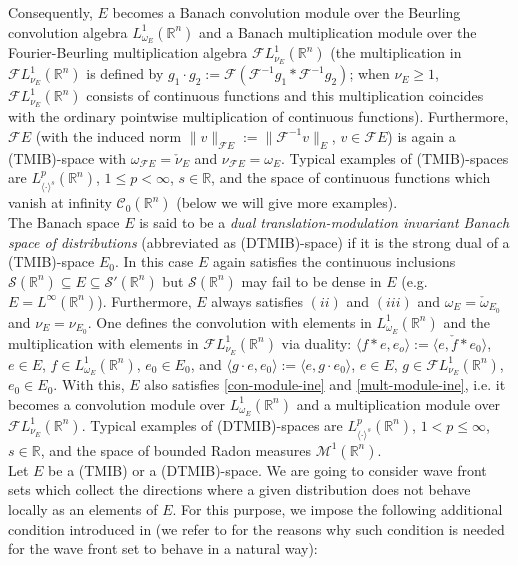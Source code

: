 \documentclass[12pt,reqno]{amsart}
\newcommand{\RR}{\mathbb R}
\newcommand{\SSS}{\mathcal S}
\theoremstyle{plain}
\theoremstyle{remark}
\theoremstyle{definition}
\numberwithin{equation}{section}
\begin{document}
Consequently, $E$ becomes a Banach convolution module over the Beurling convolution algebra $L^1_{\omega_E}(\RR^n)$ and a Banach multiplication module over the Fourier-Beurling multiplication algebra $\mathcal{F}L^1_{\nu_E}(\RR^n)$ (the multiplication in $\mathcal{F}L^1_{\nu_E}(\RR^n)$ is defined by $g_1\cdot g_2:=\mathcal{F}(\mathcal{F}^{-1}g_1*\mathcal{F}^{-1}g_2)$; when $\nu_E\geq 1$, $\mathcal{F}L^1_{\nu_E}(\RR^n)$ consists of continuous functions and this multiplication coincides with the ordinary pointwise multiplication of continuous functions). Furthermore, $\mathcal{F}E$ (with the induced norm $\|v\|_{\mathcal{F}E}:=\|\mathcal{F}^{-1}v\|_E$, $v\in\mathcal{F}E$) is again a (TMIB)-space with $\omega_{\mathcal{F}E}=\check{\nu}_E$ and $\nu_{\mathcal{F}E}=\omega_E$. Typical examples of (TMIB)-spaces are $L^p_{\langle\cdot\rangle^s}(\RR^n)$, $1\leq p<\infty$, $s\in\RR$, and the space of continuous functions which vanish at infinity $\mathcal{C}_0(\RR^n)$ (below we will give more examples).\\
\indent The Banach space $E$ is said to be a \textit{dual translation-modulation invariant Banach space of distributions} (abbreviated as (DTMIB)-space) if it is the strong dual of a (TMIB)-space $E_0$. In this case $E$ again satisfies the continuous inclusions $\SSS(\RR^n)\subseteq E\subseteq \SSS'(\RR^n)$ but $\SSS(\RR^n)$ may fail to be dense in $E$ (e.g. $E=L^{\infty}(\RR^n)$). Furthermore, $E$ always satisfies $(ii)$ and $(iii)$ and $\omega_E=\check{\omega}_{E_0}$ and $\nu_E=\nu_{E_0}$. One defines the convolution with elements in $L^1_{\omega_E}(\RR^n)$ and the multiplication with elements in $\mathcal{F}L^1_{\nu_E}(\RR^n)$ via duality: $\langle f*e,e_o\rangle:=\langle e,\check{f}*e_0\rangle$, $e\in E$, $f\in L^1_{\omega_E}(\RR^n)$, $e_0\in E_0$, and $\langle g\cdot e,e_0\rangle:=\langle e,g\cdot e_0\rangle$, $e\in E$, $g\in \mathcal{F}L^1_{\nu_E}(\RR^n)$, $e_0\in E_0$. With this, $E$ also satisfies \eqref{con-module-ine} and \eqref{mult-module-ine}, i.e. it becomes a convolution module over $L^1_{\omega_E}(\RR^n)$ and a multiplication module over $\mathcal{F}L^1_{\nu_E}(\RR^n)$. Typical examples of (DTMIB)-spaces are $L^p_{\langle\cdot\rangle^s}(\RR^n)$, $1< p\leq\infty$, $s\in\RR$, and the space of bounded Radon measures $\mathcal{M}^1(\RR^n)$.\\
\indent Let $E$ be a (TMIB) or a (DTMIB)-space. We are going to consider wave front sets which collect the directions where a given distribution does not behave locally as an elements of $E$. For this purpose, we impose the following additional condition introduced in \cite[Section 3]{DPP} (we refer to \cite[Section 3]{DPP} for the reasons why such condition is needed for the wave front set to behave in a natural way):
\end{document}
